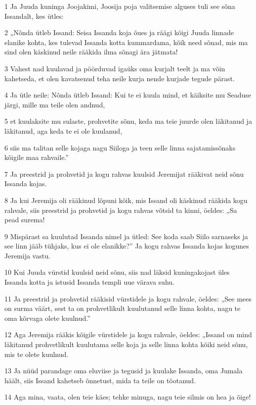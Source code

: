 \par 1 Ja Juuda kuninga Joojakimi, Joosija poja valitsemise alguses tuli see sõna Issandalt, kes ütles:
\par 2 „Nõnda ütleb Issand: Seisa Issanda koja õues ja räägi kõigi Juuda linnade elanike kohta, kes tulevad Issanda kotta kummardama, kõik need sõnad, mis ma sind olen käskinud neile rääkida ilma sõnagi ära jätmata!
\par 3 Vahest nad kuulavad ja pöörduvad igaüks oma kurjalt teelt ja ma võin kahetseda, et olen kavatsenud teha neile kurja nende kurjade tegude pärast.
\par 4 Ja ütle neile: Nõnda ütleb Issand: Kui te ei kuula mind, et käiksite mu Seaduse järgi, mille ma teile olen andnud,
\par 5 et kuulaksite mu sulaste, prohvetite sõnu, keda ma teie juurde olen läkitanud ja läkitanud, aga keda te ei ole kuulanud,
\par 6 siis ma talitan selle kojaga nagu Siiloga ja teen selle linna sajatamissõnaks kõigile maa rahvaile.”
\par 7 Ja preestrid ja prohvetid ja kogu rahvas kuulsid Jeremijat rääkivat neid sõnu Issanda kojas.
\par 8 Ja kui Jeremija oli rääkinud lõpuni kõik, mis Issand oli käskinud rääkida kogu rahvale, siis preestrid ja prohvetid ja kogu rahvas võtsid ta kinni, öeldes: „Sa pead surema!
\par 9 Mispärast sa kuulutad Issanda nimel ja ütled: See koda saab Siilo sarnaseks ja see linn jääb tühjaks, kus ei ole elanikke?” Ja kogu rahvas Issanda kojas kogunes Jeremija vastu.
\par 10 Kui Juuda vürstid kuulsid neid sõnu, siis nad läksid kuningakojast üles Issanda kotta ja istusid Issanda templi uue värava suhu.
\par 11 Ja preestrid ja prohvetid rääkisid vürstidele ja kogu rahvale, öeldes: „See mees on surma väärt, sest ta on prohvetlikult kuulutanud selle linna kohta, nagu te oma kõrvaga olete kuulnud.”
\par 12 Aga Jeremija rääkis kõigile vürstidele ja kogu rahvale, öeldes: „Issand on mind läkitanud prohvetlikult kuulutama selle koja ja selle linna kohta kõiki neid sõnu, mis te olete kuulnud.
\par 13 Ja nüüd parandage oma eluviise ja tegusid ja kuulake Issanda, oma Jumala häält, siis Issand kahetseb õnnetust, mida ta teile on tõotanud.
\par 14 Aga mina, vaata, olen teie käes; tehke minuga, nagu teie silmis on hea ja õige!
